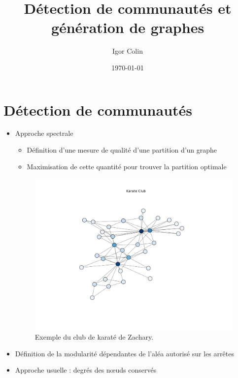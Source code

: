 \documentclass[c]{beamer}
\title{Détection de communautés et génération de graphes}
\author{Igor Colin}
\date{\today}
\newtheorem*{deffr}{Définition}
\begin{document}
\maketitle

\section{Détection de communautés}
\begin{frame}

    \begin{itemize}
        \item Approche spectrale
        \begin{itemize}
            \item Définition d'une mesure de qualité d'une partition d'un
            graphe
            \item Maximisation de cette quantité pour trouver la partition
            optimale
        \end{itemize}

        \begin{figure}
            \includegraphics[width=.6\textwidth]{./karate_club.png}
            \caption{Exemple du club de karaté de Zachary.}
        \end{figure}
    \end{itemize}
\end{frame}

\begin{frame}
    \begin{itemize}
        \begin{deffr}
            Soit $G = (V, E)$ un graphe non-orienté et soit $(S, T)$ une
            partition de $V$. La modularité associée à la partition $(S, T)$
            correspond taux d'arrêtes de $E$ contenues dans $S$ ou $T$ comparé
            au taux d'arrêtes qui auraient été contenues dans $S$ ou $T$ si
            l'on avait distribué les arrêtes du graphe aléatoirement.
        \end{deffr}

        \item Définition de la modularité dépendantes de l'aléa autorisé sur
        les arrêtes
        \item Approche usuelle : degrés des n\oe{}uds conservés
    \end{itemize}

\end{frame}
\end{document}
